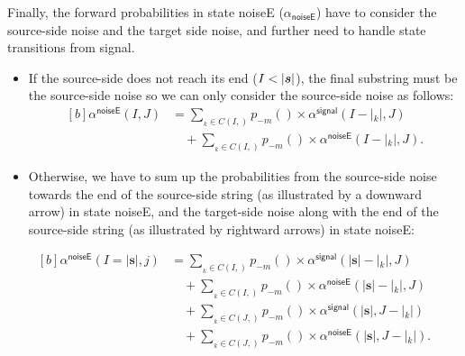 \documentclass[english]{jnlp_1.4}
\def\subpair#1#2{}
\newcommand{\svec}[1]{}
\begin{document}
Finally, the forward probabilities in state {\sf noiseE} ({$\alpha_\mathsf{noiseE}$}) have to consider
the source-side noise and the target side noise, and further need to handle state transitions from {\sf signal}.
\begin{itemize}
\item If the source-side does not reach its end ({$I < |\mbox{\boldmath $s$}|$}), 
\pagebreak
the final substring must be the source-side noise so we can only consider the source-side noise as follows:
\begin{equation}
\begin{aligned}[b]
 \alpha^\mathsf{noiseE} (I, J) 
  & = \sum_{\svec{\sigma}_{k} \in C(I,\svec{s})} p_{-m} (\subpair{\svec{\sigma}_{k}}{\mathit{noise}}) 
	\times \alpha^\mathsf{signal} (I - |\svec{\sigma}_{k}|, J) \\
  & \quad + \sum_{\svec{\sigma}_{k} \in C(I,\svec{s})} p_{-m} (\subpair{\svec{\sigma}_{k}}{\mathit{noise}}) 
	\times \alpha^\mathsf{noiseE} (I - |\svec{\sigma}_{k}|, J).  
\end{aligned}
\label{eqn:forward_noiseE1}
\end{equation}
\item Otherwise, we have to sum up the probabilities from the source-side noise towards the end of the source-side string (as illustrated by a downward arrow) in state {\sf noiseE},
and the target-side noise along with the end of the source-side string (as illustrated by rightward arrows) in state {\sf noiseE}:
\end{itemize}
\begin{equation}
\begin{aligned}[b]
 \alpha^\mathsf{noiseE} ( I=| \boldsymbol{s}|, j) 
  & = \sum_{\svec{\sigma}_{k} \in C(I,\svec{s})} p_{-m} (\subpair{\svec{\sigma}_{k}}{\mathit{noise}}) 
	\times \alpha^\mathsf{signal} (| \boldsymbol{s}| - |\svec{\sigma}_{k}|, J) \\
  & \quad  + \sum_{\svec{\sigma}_{k} \in C(I,\svec{s})} p_{-m} (\subpair{\svec{\sigma}_{k}}{\mathit{noise}}) 
	\times \alpha^\mathsf{noiseE} (| \boldsymbol{s}| - |\svec{\sigma}_{k}|, J)  \\
  & \quad  + \sum_{\svec{\tau}_{k} \in C(J,\svec{t})} p_{-m} (\subpair{\mathit{noise}}{\svec{\tau}_{k}}) 
	\times \alpha^\mathsf{signal} (| \boldsymbol{s}|, J - |\svec{\tau}_{k}|) \\
  & \quad + \sum_{\svec{\tau}_{k} \in C(J,\svec{t})} p_{-m} (\subpair{\mathit{noise}}{\svec{\tau}_{k}}) 
	\times \alpha^\mathsf{noiseE} (| \boldsymbol{s}|, J - |\svec{\tau}_{k}|). 
\end{aligned}
\label{eqn:forward_noiseE2}
\end{equation}
\end{document}

